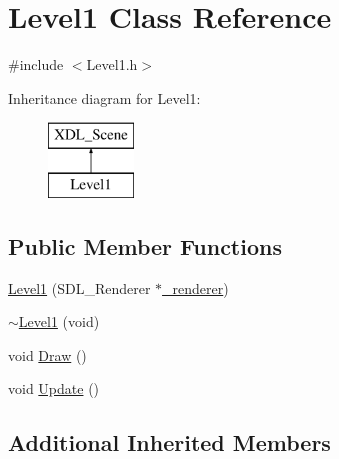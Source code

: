 \hypertarget{class_level1}{\section{Level1 Class Reference}
\label{class_level1}
}


{\ttfamily \#include $<$Level1.\-h$>$}

Inheritance diagram for Level1\-:\begin{figure}[H]
\begin{center}
\leavevmode
\includegraphics[height=2.000000cm]{class_level1}
\end{center}
\end{figure}
\subsection*{Public Member Functions}
\begin{DoxyCompactItemize}
\item 
\hyperlink{class_level1_a9fb42cfe27f4d15b86df761c556ad17a}{Level1} (S\-D\-L\-\_\-\-Renderer $\ast$\hyperlink{class_x_d_l___scene_a923ee55d91647c14f2566f1aa70e3aed}{\-\_\-renderer})
\item 
\hyperlink{class_level1_a8334c4e5a3070595d96b01e381b043fa}{$\sim$\-Level1} (void)
\item 
void \hyperlink{class_level1_ae8e845511c6fcf574f4f94cd0f986751}{Draw} ()
\item 
void \hyperlink{class_level1_a26cbf7e692665c1a1250162057583ee4}{Update} ()
\end{DoxyCompactItemize}
\subsection*{Additional Inherited Members}


